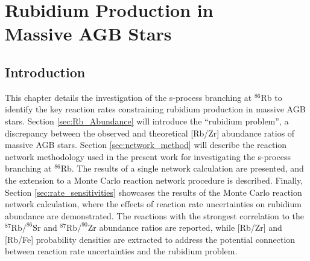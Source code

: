 \chapter[Rubidium Production in Massive AGB Stars]{\textbf{Rubidium Production in \\ Massive AGB Stars}}
\label{ch:Rb}



\section{Introduction}


This chapter details the investigation of the s-process branching at $^{86}$Rb to identify the key reaction rates constraining rubidium production in massive AGB stars. Section \ref{sec:Rb_Abundance} will introduce the ``rubidium problem'', a discrepancy between the observed and theoretical [Rb/Zr] abundance ratios of massive AGB stars. Section \ref{sec:network_method} will describe the reaction network methodology used in the present work for investigating the s-process branching at $^{86}$Rb. The results of a single network calculation are presented, and the extension to a Monte Carlo reaction network procedure is described. Finally, Section \ref{sec:rate_sensitivities} showcases the results of the Monte Carlo reaction network calculation, where the effects of reaction rate uncertainties on rubidium abundance are demonstrated. The reactions with the strongest correlation to the $^{87}\mathrm{Rb}/^{86}\mathrm{Sr}$ and $^{87}\mathrm{Rb}/^{90}\mathrm{Zr}$ abundance ratios are reported, while [Rb/Zr] and [Rb/Fe] probability densities are extracted to address the potential connection between reaction rate uncertainties and the rubidium problem. %

